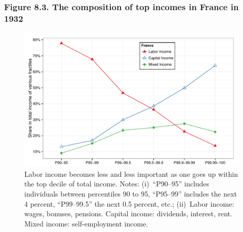\documentclass[t]{beamer}\usepackage[]{graphicx}\usepackage[]{color}
\newenvironment{knitrout}{}{} %
\begin{document}
\begin{frame}[label=Figure_8_3,fragile]
\frametitle{Figure 8.3. The composition of top incomes in France in 1932}
\begin{figure}[t]
\begin{minipage}[b]{\textwidth}
\centering
\begin{knitrout}\footnotesize
{}\color{fgcolor}

{\centering \includegraphics[width=1\linewidth]{figures/color/Figure_8_3} 

}



\end{knitrout}
\caption{\scriptsize{Labor income becomes less and less important as one goes up within the top decile of total income. Notes: (i)~``P90--95'' includes individuals between percentiles 90 to 95, ``P95--99'' includes the next 4 percent, ``P99--99.5'' the next 0.5 percent, etc.; (ii)~Labor income: wages, bonuses, pensions. Capital income: dividends, interest, rent. Mixed income: self-employment income.}}
\end{minipage}
\end{figure}
\end{frame}
\end{document}
